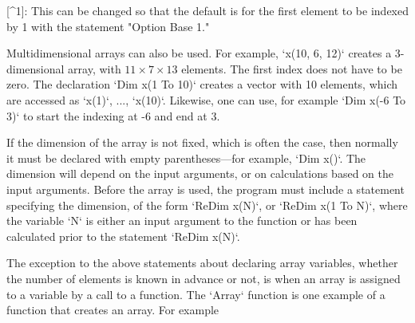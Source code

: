 [^1]: This can be changed so that the default is for the first element
    to be indexed by 1 with the statement "Option Base 1."

Multidimensional arrays can also be used. For example, `x(10, 6, 12)`
creates a 3-dimensional array, with $11 \times 7 \times 13$ elements.
The first index does not have to be zero. The declaration
`Dim x(1 To 10)` creates a vector with 10 elements, which are accessed
as `x(1)`, ..., `x(10)`. Likewise, one can use, for example
`Dim x(-6 To 3)` to start the indexing at -6 and end at 3.

If the dimension of the array is not fixed, which is often the case,
then normally it must be declared with empty parentheses---for example,
`Dim x()`. The dimension will depend on the input arguments, or on
calculations based on the input arguments. Before the array is used, the
program must include a statement specifying the dimension, of the form
`ReDim x(N)`, or `ReDim x(1 To N)`, where the variable `N` is either an
input argument to the function or has been calculated prior to the
statement `ReDim x(N)`.

The exception to the above statements about declaring array variables,
whether the number of elements is known in advance or not, is when an
array is assigned to a variable by a call to a function. The `Array`
function is one example of a function that creates an array. For example

